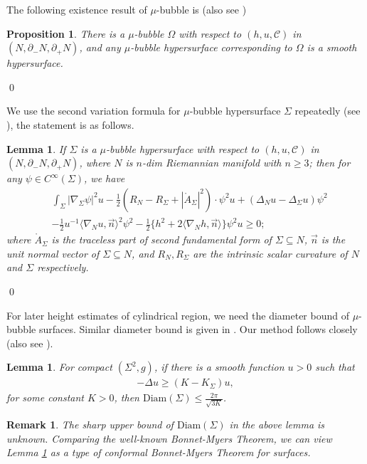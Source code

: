 \documentclass[11pt]{amsart}
\newtheorem{prop}[theorem]{Proposition}
\newtheorem{lemma}[theorem]{Lemma}
\newtheorem{remark}[theorem]{Remark}
\numberwithin{equation}{section}
\begin{document}
The following existence result of $\mu$-bubble is \cite[Proposition $12$]{CL} (also see \cite[Proposition $2.1$]{Zhu-bubble})
\begin{prop}\label{prop existence of bubbles}
{There is a $\mu$-bubble $\Omega$ with respect to $(h, u, \mathcal{C})$ in $(N, \partial_{-}N, \partial_{+}N)$, and any $\mu$-bubble hypersurface corresponding to $\Omega$ is a smooth hypersurface.
}
\end{prop}\qed

We use the second variation formula for $\mu$-bubble hypersurface $\Sigma$ repeatedly (see \cite[Lemma $13$ and $14$]{CL}), the statement is as follows.
\begin{lemma}\label{lem 1st and 2nd vari of bubble}
{If $\Sigma$ is a $\mu$-bubble hypersurface with respect to $(h, u, \mathcal{C})$ in $(N, \partial_{-}N, \partial_{+}N)$,  where $N$ is $n$-dim Riemannian manifold with $n\geq 3$; then for any $\psi\in C^\infty(\Sigma)$,  we have
\begin{align}
&\int_\Sigma |\nabla_\Sigma \psi|^2 u- \frac{1}{2}(R_N- R_\Sigma+ |\mathring{A}_\Sigma|^2)\cdot \psi^2 u+ (\Delta_N u- \Delta_\Sigma u)\psi^2 \nonumber \\
&-\frac{1}{2}u^{-1}\langle \nabla_N u, \vec{n}\rangle^2\psi^2- \frac{1}{2}\{h^2+ 2\langle \nabla_N h, \vec{n}\rangle\}\psi^2 u \geq 0;\label{2nd vari ineq-higher dim}
\end{align}
where $\mathring{A}_\Sigma$ is the traceless part of second fundamental form of $\Sigma\subseteq N$,  $\vec{n}$ is the unit normal vector of $\Sigma\subseteq N$,  and $R_N, R_\Sigma$ are the intrinsic scalar curvature of $N$ and $\Sigma$ respectively.
}
\end{lemma}\qed

For later height estimates of cylindrical region, we need the diameter bound of $\mu$-bubble surfaces.  Similar diameter bound is given in \cite[Lemma $16$]{CL}.  Our method follows closely \cite{SY-CMP} (also see \cite{SY-PSC}). 

\begin{lemma}\label{lem the diameter upper bound of 2-dim surface-SY}
{For compact $(\Sigma^2, g)$, if there is a smooth function $u> 0$ such that 
\begin{align}
-\Delta u\geq (K- K_\Sigma)u, \nonumber 
\end{align}
for some constant $K> 0$, then $\mathrm{Diam}(\Sigma)\leq \frac{2\pi}{\sqrt{3K}}$. 
}
\end{lemma}

\begin{remark}\label{rem PDE Bonnet-Myers thm}
{The sharp upper bound of $\mathrm{Diam}(\Sigma)$ in the above lemma is unknown.  Comparing the well-known Bonnet-Myers Theorem,  we can view Lemma \ref{lem the diameter upper bound of 2-dim surface-SY} as a type of conformal Bonnet-Myers Theorem for surfaces.   
}
\end{remark}
\end{document}

